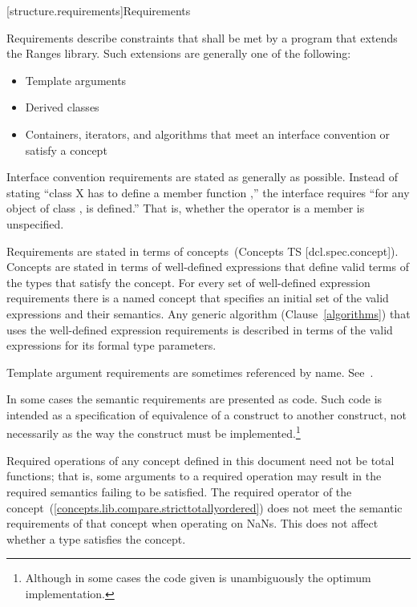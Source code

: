 [structure.requirements]{Requirements}

\pnum
{}%
Requirements describe constraints that shall be met by a \Cpp program that extends the Ranges library.
Such extensions are generally one of the following:

\begin{itemize}
\item Template arguments
\item Derived classes
\item Containers, iterators, and algorithms that meet an interface convention
or satisfy a concept
\end{itemize}

\pnum
Interface convention requirements are stated as generally as possible. Instead
of stating ``class X has to define a member function ,'' the
interface requires ``for any object  of class ,  is
defined.'' That is, whether the operator is a member is unspecified.

\pnum
Requirements are stated in terms of concepts~(Concepts TS [dcl.spec.concept]).
Concepts are stated in terms of well-defined expressions that define valid terms of
the types that satisfy the concept. For every set of
well-defined expression requirements there is a named concept that
specifies an initial set of the valid expressions and their semantics. Any generic
algorithm (Clause~\ref{algorithms}) that uses the well-defined expression requirements
is described in terms of the valid expressions for its formal type parameters.

\pnum
Template argument requirements are sometimes referenced by name.
See~.

\pnum
In some cases the semantic requirements are presented as \Cpp code.
Such code is intended as a
specification of equivalence of a construct to another construct, not
necessarily as the way the construct
must be implemented.\footnote{Although in some cases the code given is
unambiguously the optimum implementation.}

\pnum
Required operations of any concept defined in this document need not be
total functions; that is, some arguments to a required operation may
result in the required semantics failing to be satisfied. \enterexample
The required \tcode{<} operator of the 
concept~(\ref{concepts.lib.compare.stricttotallyordered}) does not meet the
semantic requirements of that concept when operating on NaNs.\exitexample
This does not affect whether a type satisfies the concept.


